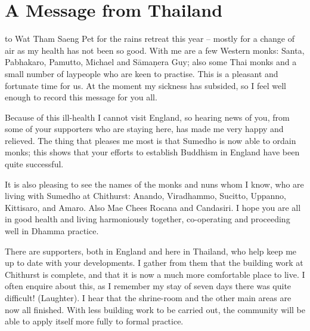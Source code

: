 
\chapter{A Message from Thailand}

 to Wat Tham Saeng Pet for the rains retreat this year -- mostly for a change of air as my health has not been so good. With me are a few Western monks: Santa, Pabhakaro, Pamutto, Michael and S\=ama\d{n}era Guy; also some Thai monks and a small number of laypeople who are keen to practise. This is a pleasant and fortunate time for us. At the moment my sickness has subsided, so I feel well enough to record this message for you all.

Because of this ill-health I cannot visit England, so hearing news of you, from some of your supporters who are staying here, has made me very happy and relieved. The thing that pleases me most is that Sumedho is now able to ordain monks; this shows that your efforts to establish Buddhism in England have been quite successful.

It is also pleasing to see the names of the monks and nuns whom I know, who are living with Sumedho at Chithurst: Anando, Viradhammo, Sucitto, Uppanno, Kittisaro, and Amaro. Also Mae Chees Rocana and Candasiri. I hope you are all in good health and living harmoniously together, co-operating and proceeding well in Dhamma practice.

There are supporters, both in England and here in Thailand, who help keep me up to date with your developments. I gather from them that the building work at Chithurst is complete, and that it is now a much more comfortable place to live. I often enquire about this, as I remember my stay of seven days there was quite difficult! (Laughter). I hear that the shrine-room and the other main areas are now all finished. With less building work to be carried out, the community will be able to apply itself more fully to formal practice.

